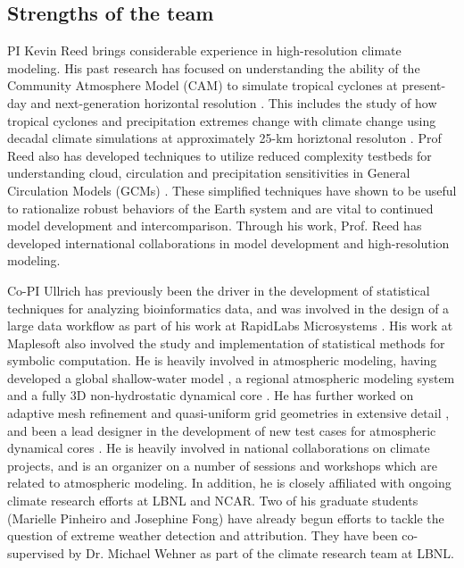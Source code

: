 \documentclass[11pt]{article}
\begin{document}
\subsection{Strengths of the team}
PI Kevin Reed brings considerable experience in high-resolution climate modeling.  His past research has focused on understanding the ability of the Community Atmosphere Model (CAM) to simulate tropical cyclones at present-day and next-generation horizontal resolution \citep{Reed2011a,Reed2011c}.  This includes the study of how tropical cyclones and precipitation extremes change with climate change using decadal climate simulations at approximately 25-km horiztonal resoluton \citep{Wehner2014,Wehner2015}. Prof Reed also has developed techniques to utilize reduced complexity testbeds for understanding cloud, circulation and precipitation sensitivities in General Circulation Models (GCMs) \citep{Reed2012a,Reed2014}. These simplified techniques have shown to be useful to rationalize robust behaviors of the Earth system and are vital to continued model development and intercomparison. Through his work, Prof. Reed has developed international collaborations in model development and high-resolution modeling.

Co-PI Ullrich has previously been the driver in the development of statistical techniques for analyzing bioinformatics data, and was involved in the design of a large data workflow as part of his work at RapidLabs Microsystems \citep{mikkelsen2005patent}.  His work at Maplesoft also involved the study and implementation of statistical methods for symbolic computation.  He is heavily involved in atmospheric modeling, having developed a global shallow-water model \citep{PAUCJBVL2010JCP}, a regional atmospheric modeling system \citep{PAUCJ2012MWR} and a fully 3D non-hydrostatic dynamical core \citep{PAUCJ2012JCP}.  He has further worked on adaptive mesh refinement and quasi-uniform grid geometries in extensive detail \citep{HJPCPMPAU2013MWR}, and been a lead designer in the development of new test cases for atmospheric dynamical cores \citep{PAUTMCJAS2013QJRMS,kent2013dcmip}.  He is heavily involved in national collaborations on climate projects, and is an organizer on a number of sessions and workshops which are related to atmospheric modeling.  In addition, he is closely affiliated with ongoing climate research efforts at LBNL and NCAR.  Two of his graduate students (Marielle Pinheiro and Josephine Fong) have already begun efforts to tackle the question of extreme weather detection and attribution.  They have been co-supervised by Dr. Michael Wehner as part of the climate research team at LBNL.
\end{document}
